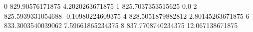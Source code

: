 0 829.90576171875 4.2020263671875
1 825.7037353515625 0.0
2 825.5939331054688 -0.10980224609375
4 828.5051879882812 2.80145263671875
6 833.3003540039062 7.59661865234375
8 837.7708740234375 12.067138671875
